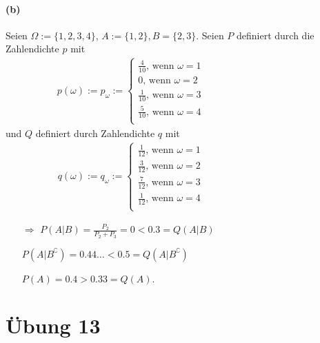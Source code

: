 \documentclass[10pt, a4paper]{article}
\begin{document}
\paragraph*{(b)}
Seien $\Omega:=\{1,2,3,4\}$, $A:=\{1,2\}, B=\{2,3\}$. Seien $P$ definiert durch die Zahlendichte $p$ mit	\\
\begin{align*}
	p(\omega):=p_{\omega}:=
	\begin{cases}
	\frac{4}{10}\text{, wenn }\omega=1	\\
	0\text{, wenn }\omega=2	\\
	\frac{1}{10}\text{, wenn }\omega=3	\\
	\frac{5}{10}\text{, wenn }\omega=4	\\
	\end{cases}	\hspace{120pt}
\end{align*}
und $Q$ definiert durch Zahlendichte $q$ mit
\begin{align*}
	q(\omega):=q_{\omega}:=
	\begin{cases}
	\frac{1}{12}\text{, wenn }\omega=1	\\
	\frac{3}{12}\text{, wenn }\omega=2	\\
	\frac{7}{12}\text{, wenn }\omega=3	\\
	\frac{1}{12}\text{, wenn }\omega=4	\\
	\end{cases}	\hspace{120pt}
\end{align*}
\begin{itemize}
	\item[$\Rightarrow$]$P(A|B)=\frac{P_{2}}{P_{2}+P_{3}}=0<0.3=Q(A|B)$
	\item[]$P(A|B^{\complement})=0.44\dots<0.5=Q(A|B^{\complement})$
	\item[]$P(A)=0.4>0.33=Q(A)$.
\end{itemize}



\section{Übung 13}
\end{document}
